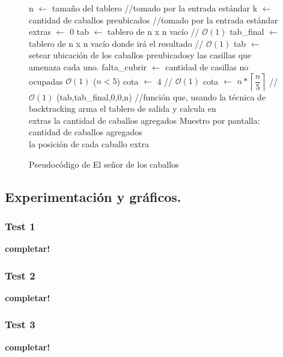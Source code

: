 \begin{figure}
\begin{codebox}
\li n $\leftarrow$ tamaño del tablero //tomado por la entrada estándar
\li k $\leftarrow$ cantidad de caballos preubicados //tomado por la entrada estándar
\li extras $\leftarrow$ 0
\li tab $\leftarrow$ tablero de n x n vacío // $\mathcal{O}(1)$
\li tab_final $\leftarrow$ tablero de n x n vacío donde irá el resultado // $\mathcal{O}(1)$
\li tab $\leftarrow$ setear ubicación de los caballos preubicadosy las casillas que amenaza cada uno.
\li falta_cubrir $\leftarrow$ cantidad de casillas no ocupadas $\mathcal{O}(1)$
\li \If ($n < 5$)
\li \quad cota $\leftarrow$ 4  // $\mathcal{O}(1)$
\li \Else
\li \quad cota $\leftarrow$ $n*\left \lceil \dfrac{n}{5} \right \rceil$   // $\mathcal{O}(1)$
(tab,tab_final,0,0,n)
\li //función que, usando la técnica de backtracking arma el tablero de salida y calcula en\\ extras la cantidad de caballos agregados
\li Muestro por pantalla: cantidad de caballos agregados\\la posición de cada caballo extra
\end{codebox}
\caption{Pseudocódigo de El señor de los caballos}\label{code:caballos}
\end{figure}
\FloatBarrier

\vspace*{0.6cm}

\subsection{Experimentación y gráficos.}

\vspace*{0.3cm}

\subsubsection{Test 1}

\vspace*{0.3cm}

\textbf{completar!}


\newpage
\subsubsection{Test 2}

\vspace*{0.3cm}

\textbf{completar!}


\newpage
\subsubsection{Test 3}

\vspace*{0.3cm}

\textbf{completar!}
